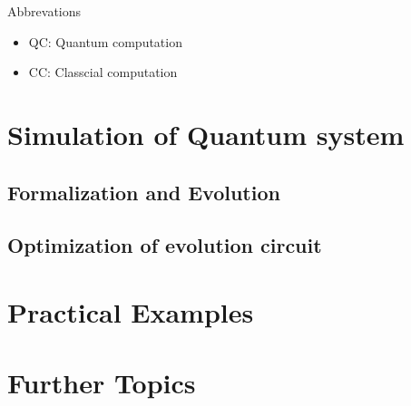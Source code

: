 \documentclass[10pt]{book}
\begin{document}
Abbrevations

\begin{itemize}
    \item QC: Quantum computation
    \item CC: Classcial computation
\end{itemize}

\newpage

\part{Simulation of Quantum system}
\chapter{Formalization and Evolution}





\newpage
\chapter{Optimization of evolution circuit}


\newpage
\part{Practical Examples}








\newpage
\part{Further Topics}

\newpage


\end{document}
